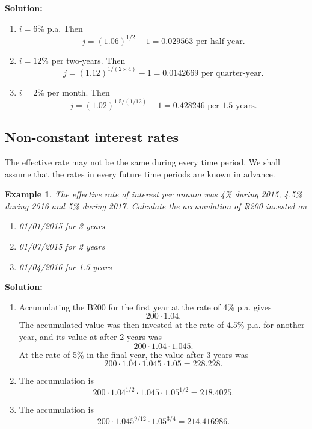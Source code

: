 \documentclass[
]{book}
\theoremstyle{definition}
\theoremstyle{definition}
\newtheorem{example}{Example}[chapter]
\theoremstyle{definition}
\theoremstyle{definition}
\theoremstyle{remark}
\begin{document}
\textbf{Solution:}

\begin{enumerate}
\def\labelenumi{\arabic{enumi}.}
\item
  \(i = 6\%\) p.a. Then
  \[j = (1.06)^{1/2} -1 = 0.029563 \text{ per half-year}.\]
\item
  \(i = 12\%\) per two-years. Then
  \[j = (1.12)^{1/(2\times4)} -1 = 0.0142669 \text{ per quarter-year}.\]
\item
  \(i = 2\%\) per month. Then
  \[j = (1.02)^{1.5/(1/12)} -1 = 0.428246 \text{ per 1.5-years}.\]
\end{enumerate}

\subsection{Non-constant interest rates}\label{non-constant-interest-rates}

The effective rate may not be the same during every time period. We
shall assume that the rates in every future time periods are known in
advance.

\begin{example}

\emph{The effective rate of interest per annum was 4\% during 2015, 4.5\%
during 2016 and 5\% during 2017. Calculate the accumulation of ฿200
invested on}

\begin{enumerate}
\def\labelenumi{\arabic{enumi}.}
\item
  \emph{01/01/2015 for 3 years}
\item
  \emph{01/07/2015 for 2 years}
\item
  \emph{01/04/2016 for 1.5 years}
\end{enumerate}

\end{example}

\textbf{Solution:}

\begin{enumerate}
\def\labelenumi{\arabic{enumi}.}
\item
  Accumulating the ฿200 for the first year at the rate of 4\% p.a.
  gives \[200 \cdot 1.04.\] The accumulated value was then invested at
  the rate of 4.5\% p.a. for another year, and its value at after 2
  years was \[200 \cdot 1.04 \cdot 1.045.\] At the rate of 5\% in the
  final year, the value after 3 years was
  \[200 \cdot 1.04 \cdot 1.045 \cdot 1.05 = 228.228.\]
\item
  The accumulation is
  \[200 \cdot 1.04^{1/2} \cdot 1.045 \cdot 1.05^{1/2} = 218.4025.\]
\item
  The accumulation is
  \[200 \cdot 1.045^{9/12} \cdot 1.05^{3/4} = 214.416986.\]
\end{enumerate}
\end{document}

